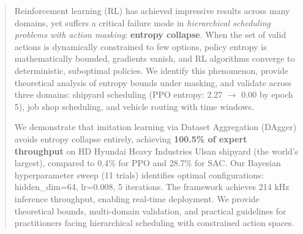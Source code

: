 \begin{abstract}
Reinforcement learning (RL) has achieved impressive results across many domains, yet suffers a critical failure mode in \textit{hierarchical scheduling problems with action masking}: \textbf{entropy collapse}. When the set of valid actions is dynamically constrained to few options, policy entropy is mathematically bounded, gradients vanish, and RL algorithms converge to deterministic, suboptimal policies. We identify this phenomenon, provide theoretical analysis of entropy bounds under masking, and validate across three domains: shipyard scheduling (PPO entropy: 2.27 $\to$ 0.00 by epoch 5), job shop scheduling, and vehicle routing with time windows.

We demonstrate that imitation learning via Dataset Aggregation (DAgger) avoids entropy collapse entirely, achieving \textbf{100.5\% of expert throughput} on HD Hyundai Heavy Industries Ulsan shipyard (the world's largest), compared to 0.4\% for PPO and 28.7\% for SAC. Our Bayesian hyperparameter sweep (11 trials) identifies optimal configurations: hidden\_dim=64, lr=0.008, 5 iterations. The framework achieves 214 kHz inference throughput, enabling real-time deployment. We provide theoretical bounds, multi-domain validation, and practical guidelines for practitioners facing hierarchical scheduling with constrained action spaces.
\end{abstract}
